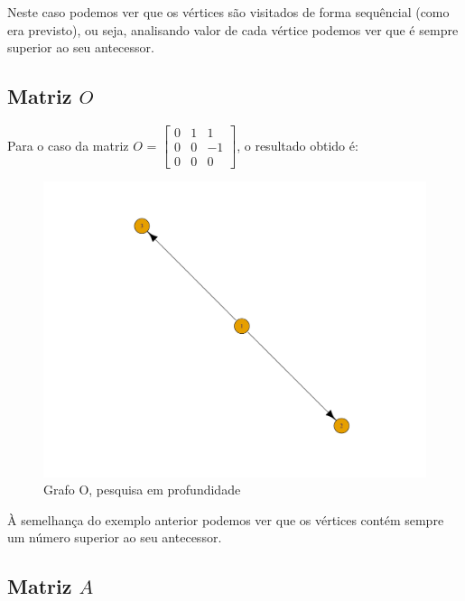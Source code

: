 \documentclass[a4paper,12pt]{report}
\begin{document}
Neste caso podemos ver que os vértices são visitados de forma sequêncial (como era previsto), ou seja, analisando valor de cada vértice podemos ver que é sempre superior ao seu antecessor.

\subsection*{Matriz $O$}

Para o caso da matriz $O$ = $\begin{bmatrix}
    0&1&1\\
    0&0&-1\\
    0&0&0
\end{bmatrix}$, o resultado obtido é:
\begin{figure}[H]
    \centering
        \includegraphics[scale=0.25]{img/dfsO.pdf}
    \caption{Grafo O, pesquisa em profundidade}
    \label{fig:dfsP}
\end{figure}

À semelhança do exemplo anterior podemos ver que os vértices contém sempre um número superior ao seu antecessor.

\subsection*{Matriz $A$}
\end{document}

